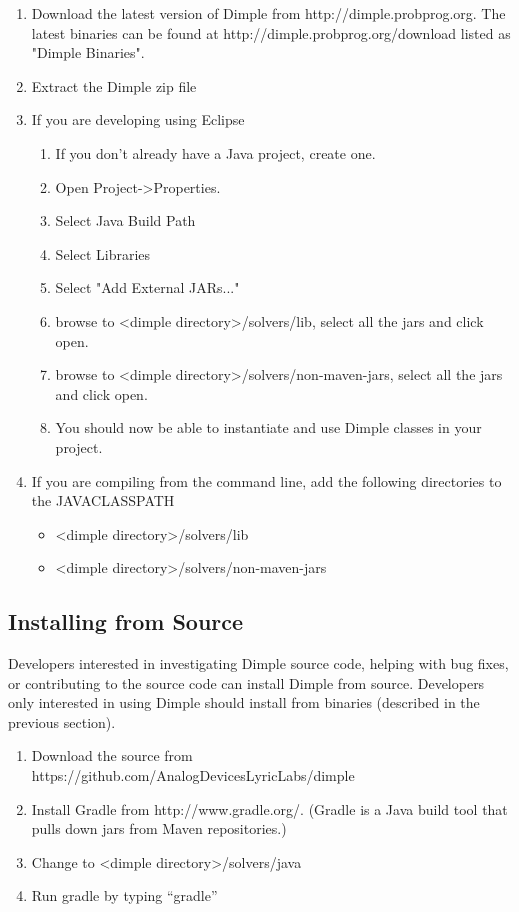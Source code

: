 \fi

\ifjava

\begin{enumerate}
\item Download the latest version of Dimple from http://dimple.probprog.org.  The latest binaries can be found at http://dimple.probprog.org/download listed as "Dimple Binaries".
\item Extract the Dimple  zip file
\item If you are developing using Eclipse
\begin{enumerate}
\item If you don't already have a Java project, create one.
\item Open Project-\textgreater Properties.
\item Select Java Build Path
\item Select Libraries
\item Select "Add External JARs..."
\item browse to \textless dimple directory\textgreater /solvers/lib, select all the jars and click open.
\item browse to \textless dimple directory\textgreater /solvers/non-maven-jars, select all the jars and click open.
\item You should now be able to instantiate and use Dimple classes in your project.
\end{enumerate}
\item If you are compiling from the command line, add the following directories to the JAVACLASSPATH
\begin{itemize}
\item \textless dimple directory\textgreater /solvers/lib
\item \textless dimple directory\textgreater /solvers/non-maven-jars
\end{itemize}
\end{enumerate}

\fi

\subsection{Installing from Source}

Developers interested in investigating Dimple source code, helping with bug fixes, or contributing to the source code can install Dimple from source.  Developers only interested in using Dimple should install from binaries (described in the previous section).

\begin{enumerate}
\item Download the source from https://github.com/AnalogDevicesLyricLabs/dimple
\item Install Gradle from http://www.gradle.org/.  (Gradle is a Java build tool that pulls down jars from Maven repositories.)
\item Change to \textless dimple directory\textgreater /solvers/java 
\item Run gradle by typing ``gradle''
\end{enumerate}

